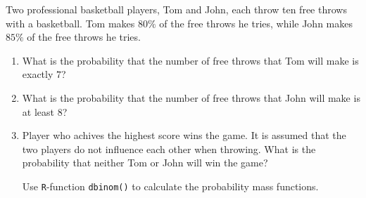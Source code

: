 
\begin{exercise}

Two professional basketball players, Tom and John, each throw ten free throws with a basketball.
Tom makes $80 \%$ of the free throws he tries, while John makes $85 \%$ of the free throws he tries.

\begin{enumerate}[label = (\alph*)]
    
    \item What is the probability that the number of free throws that Tom will make is exactly $7$?
    
    \item What is the probability that the number of free throws that John will make is at least $8$?
    
    \item Player who achives the highest score wins the game.
    It is assumed that the two players do not influence each other when throwing.
    What is the probability that neither Tom or John will win the game?

    Use \texttt R-function \texttt{dbinom()} to calculate the probability mass functions.

\end{enumerate}

\end{exercise}


